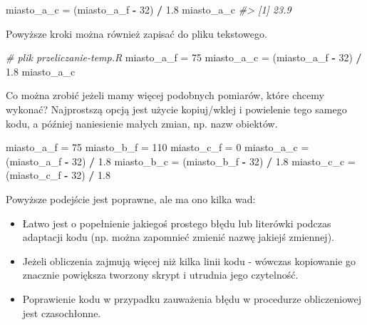 \documentclass[paper=6in:9in,pagesize=pdftex,headinclude=on,footinclude=on,10pt]{scrbook}
\newenvironment{Shaded}{\begin{snugshade}}{\end{snugshade}}
\newcommand{\CommentTok}[1]{\textcolor[rgb]{0.56,0.35,0.01}{\textit{#1}}}
\newcommand{\DecValTok}[1]{\textcolor[rgb]{0.00,0.00,0.81}{#1}}
\newcommand{\FloatTok}[1]{\textcolor[rgb]{0.00,0.00,0.81}{#1}}
\newcommand{\NormalTok}[1]{#1}
\newcommand{\OperatorTok}[1]{\textcolor[rgb]{0.81,0.36,0.00}{\textbf{#1}}}
\newcommand{\StringTok}[1]{\textcolor[rgb]{0.31,0.60,0.02}{#1}}
\providecommand{\tightlist}{%
  \setlength{\itemsep}{0pt}\setlength{\parskip}{0pt}}
\begin{document}
\begin{Shaded}
\begin{Highlighting}[]
\NormalTok{miasto_a_c =}\StringTok{ }\NormalTok{(miasto_a_f }\OperatorTok{-}\StringTok{ }\DecValTok{32}\NormalTok{) }\OperatorTok{/}\StringTok{ }\FloatTok{1.8}
\NormalTok{miasto_a_c}
\CommentTok{#> [1] 23.9}
\end{Highlighting}
\end{Shaded}

Powyższe kroki można również zapisać do pliku tekstowego.

\begin{Shaded}
\begin{Highlighting}[]
\CommentTok{# plik przeliczanie-temp.R}
\NormalTok{miasto_a_f =}\StringTok{ }\DecValTok{75}
\NormalTok{miasto_a_c =}\StringTok{ }\NormalTok{(miasto_a_f }\OperatorTok{-}\StringTok{ }\DecValTok{32}\NormalTok{) }\OperatorTok{/}\StringTok{ }\FloatTok{1.8}
\NormalTok{miasto_a_c}
\end{Highlighting}
\end{Shaded}

Co można zrobić jeżeli mamy więcej podobnych pomiarów, które chcemy wykonać?
Najprostszą opcją jest użycie kopiuj/wklej i powielenie tego samego kodu, a później naniesienie małych zmian, np. nazw obiektów.

\begin{Shaded}
\begin{Highlighting}[]
\NormalTok{miasto_a_f =}\StringTok{ }\DecValTok{75}
\NormalTok{miasto_b_f =}\StringTok{ }\DecValTok{110}
\NormalTok{miasto_c_f =}\StringTok{ }\DecValTok{0}
\NormalTok{miasto_a_c =}\StringTok{ }\NormalTok{(miasto_a_f }\OperatorTok{-}\StringTok{ }\DecValTok{32}\NormalTok{) }\OperatorTok{/}\StringTok{ }\FloatTok{1.8}
\NormalTok{miasto_b_c =}\StringTok{ }\NormalTok{(miasto_b_f }\OperatorTok{-}\StringTok{ }\DecValTok{32}\NormalTok{) }\OperatorTok{/}\StringTok{ }\FloatTok{1.8}
\NormalTok{miasto_c_c =}\StringTok{ }\NormalTok{(miasto_c_f }\OperatorTok{-}\StringTok{ }\DecValTok{32}\NormalTok{) }\OperatorTok{/}\StringTok{ }\FloatTok{1.8}
\end{Highlighting}
\end{Shaded}

Powyższe podejście jest poprawne, ale ma ono kilka wad:

\begin{itemize}
\tightlist
\item
  Łatwo jest o popełnienie jakiegoś prostego błędu lub literówki podczas adaptacji kodu (np. można zapomnieć zmienić nazwę jakiejś zmiennej).
\item
  Jeżeli obliczenia zajmują więcej niż kilka linii kodu - wówczas kopiowanie go znacznie powiększa tworzony skrypt i utrudnia jego czytelność.
\item
  Poprawienie kodu w przypadku zauważenia błędu w procedurze obliczeniowej jest czasochłonne.
\end{itemize}
\end{document}
